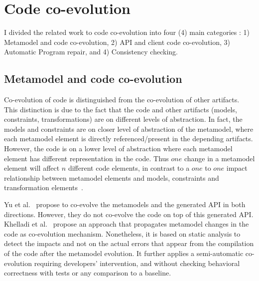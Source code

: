 
 \section{Code co-evolution}
 \label{coevolutioncode}
 I divided the related work to code co-evolution  into four (4) main categories : 1) Metamodel and code co-evolution, 2) API and client code co-evolution, 3) Automatic Program repair, and 4) Consistency checking. 
 \subsection{Metamodel and code co-evolution}
 Co-evolution of code is distinguished from the co-evolution of other artifacts. This distinction is due to the fact that the code and other artifacts (models, constraints, transformations) are on different levels of abstraction. In fact, the models and constraints are on closer level of abstraction of the metamodel, where each metamodel element is directly referenced/present in the depending artifacts. However, the code is on a lower level of abstraction where each  metamodel element has different representation in the code. Thus $one$ change in a metamodel element will affect $n$ different code elements, in contrast to a $one$ to $one$ impact relationship between metamodel elements and models, constraints and transformation elements~\cite{kessentini2018integrating,kessentini2019automated,cicchetti2008automating,herrmannsdoerfer2009cope,garces2009managing,wachsmuth2007metamodel,batot2017heuristic,khelladi2017semi,correa2007refactoring,kessentini2018automated,khelladi2018change,garces2014adapting,10.1007/978-3-642-36089-3_9,kusel2015consistent,kusel2015systematic}.
 
 Yu et al.~\cite{yu2012maintaining} propose to co-evolve the metamodels and the generated API in both directions. However, they do not co-evolve the code on top of this generated API.
  Khelladi et al.~\cite{Khelladi2020} propose an approach that propagates metamodel changes in the code as co-evolution mechanism. Nonetheless, it is based on static analysis to detect the impacts and not on the actual errors that appear from the compilation of the code after the metamodel evolution. It further applies a semi-automatic co-evolution requiring developers' intervention, and without checking behavioral correctness with tests or any comparison to a baseline. 
 
